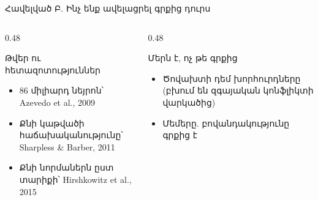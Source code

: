 \begin{frame}{Հավելված Բ. Ինչ ենք ավելացրել գրքից դուրս}
  \begin{columns}[T]
    \begin{column}{0.48\textwidth}
      \begin{card}[colback=mint!30!cardwhite, fontupper=\scriptsize]
        {\blackfont Թվեր ու հետազոտություններ}\par\smallskip
        \begin{itemize}\setlength{\itemsep}{0.5mm}
          \item 86 միլիարդ նեյրոն՝ Azevedo et al., 2009
          \item Քնի կաթվածի հաճախականությունը՝ Sharpless \& Barber, 2011
          \item Քնի նորմաներն ըստ տարիքի՝ Hirshkowitz et al., 2015
        \end{itemize}
      \end{card}
    \end{column}
    \begin{column}{0.48\textwidth}
      \begin{card}[colback=peach!35!cardwhite, fontupper=\scriptsize]
        {\blackfont Մերն է, ոչ թե գրքից}\par\smallskip
        \begin{itemize}\setlength{\itemsep}{0.5mm}
          \item Ծովախտի դեմ խորհուրդները (բխում են զգայական կոնֆլիկտի վարկածից)
          \item Մեմերը. բովանդակությունը գրքից է
        \end{itemize}
      \end{card}
    \end{column}
  \end{columns}
\end{frame}

